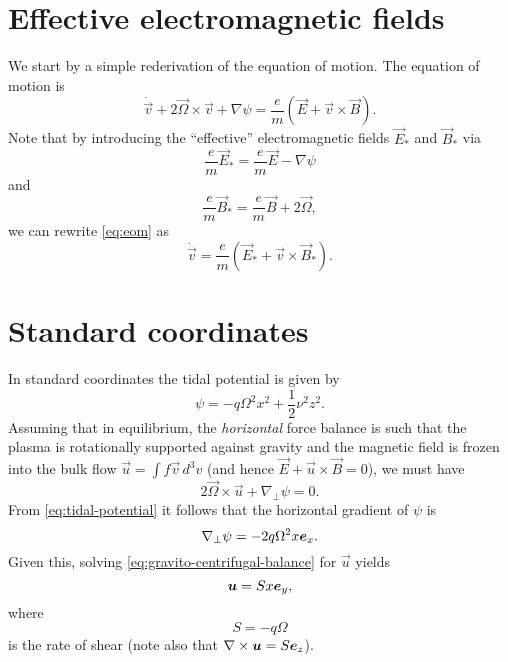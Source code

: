\documentclass[aps,pre,notitlepage,amsmath,amssymb,amsfonts,nobibnotes,nofootinbib,superscriptaddress,onecolumn,a4paper,10pt]{revtex4-1}
\begin{document}
\section{Effective electromagnetic fields}
We start by a simple rederivation of the equation of motion.
The equation of motion is
\begin{equation}
  \label{eq:eom}
  \dot{\vec{v}} + 2\vec{\Omega}\times\vec{v} + \nabla\psi =
  \frac{e}{m}(\vec{E} + \vec{v}\times\vec{B}).
\end{equation}
Note that by introducing the ``effective'' electromagnetic fields
$\vec{E}_\ast$ and $\vec{B}_\ast$ via
\begin{equation}
  \frac{e}{m}\vec{E}_\ast = \frac{e}{m}\vec{E} - \nabla\psi
\end{equation}
and
\begin{equation}
  \frac{e}{m}\vec{B}_\ast = \frac{e}{m}\vec{B} + 2\vec{\Omega},
\end{equation}
we can rewrite \cref{eq:eom} as
\begin{equation}
  \dot{\vec{v}} =
  \frac{e}{m}(\vec{E}_\ast + \vec{v}\times\vec{B}_\ast).
\end{equation}

\section{Standard coordinates}
In standard coordinates the tidal potential is given by
\begin{equation}
  \label{eq:tidal-potential}
  \psi = -q\Omega^2 x^2 + \frac{1}{2}\nu^2 z^2.
\end{equation}
Assuming that in equilibrium, the \emph{horizontal} force balance is such that
the plasma is rotationally supported against gravity and the magnetic field is
frozen into the bulk flow $\vec{u}=\int\!f\vec{v}\,d^3v$ (and hence
$\vec{E}+\vec{u}\times\vec{B}=0$), we must have
\begin{equation}
  \label{eq:gravito-centrifugal-balance}
  2\vec{\Omega}\times\vec{u} + \nabla_\perp\psi = 0.
\end{equation}
From \cref{eq:tidal-potential} it follows that the horizontal gradient of
$\psi$ is
\begin{equation}
   \nabla_\perp\psi = -2q\Omega^2 x\bm{e}_x.
\end{equation}
Given this, solving \cref{eq:gravito-centrifugal-balance} for $\vec{u}$ yields
\begin{equation}
  \label{eq:common-shear-flow}
  \bm{u} = Sx\bm{e}_y,
\end{equation}
where
\begin{equation}
  \label{eq:rate-of-shear}
  S = -q\Omega
\end{equation}
is the rate of shear (note also that $\nabla\times\bm{u}=S\bm{e}_z$).
\end{document}
